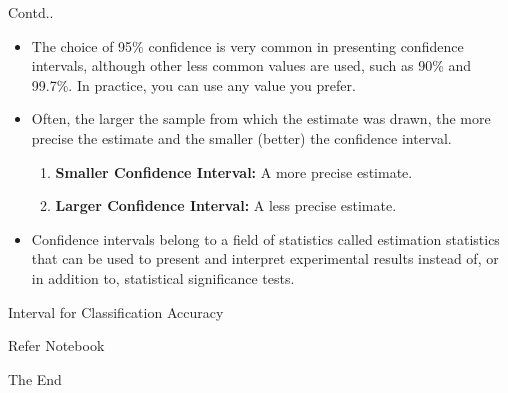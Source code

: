 \documentclass{beamer}
\begin{document}
\begin{frame}{Contd..}
	\begin{itemize}
		\item The choice of 95\% confidence is very common in presenting confidence intervals, although other less common values are used, such as 90\% and 99.7\%. In practice, you can use any value you prefer.
		\item Often, the larger the sample from which the estimate was drawn, the more precise the estimate and the smaller (better) the confidence interval.
		\begin{enumerate}
			\item \textbf{Smaller Confidence Interval:} A more precise estimate.
			\item \textbf{Larger Confidence Interval:} A less precise estimate.
		\end{enumerate}
		\item Confidence intervals belong to a field of statistics called estimation statistics that can be used to present and interpret experimental results instead of, or in addition to, statistical significance tests.
	\end{itemize}
\end{frame}

\begin{frame}{Interval for Classification Accuracy}
	\huge{\centerline{Refer Notebook}}
\end{frame}

\begin{frame}
\huge{\centerline{The End}}
\end{frame}
\end{document}
